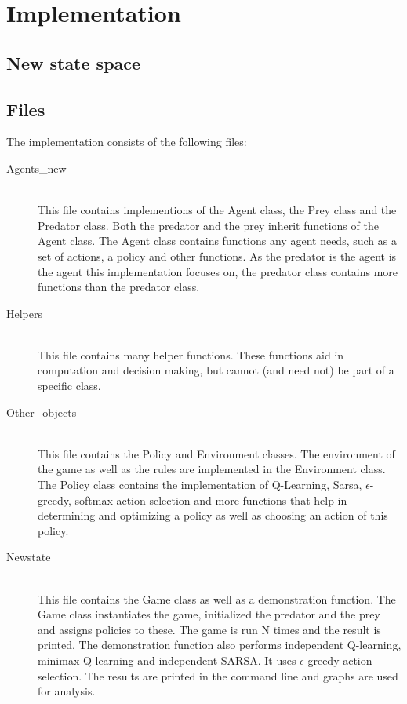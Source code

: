 \documentclass{article}
\begin{document}
\section{Implementation}

\subsection{New state space}


\subsection{Files}

The implementation consists of the following files:
\begin{description}
	\item[Agents\_new] \hfill \\ 
	This file contains implementions of the Agent class, the Prey class and the Predator class. Both the predator and the prey inherit functions of the Agent class. The Agent class contains functions any agent needs, such as a set of actions, a policy and other functions. As the predator is the agent is the agent this implementation focuses on, the predator class contains more functions than the predator class.
	
	\item[Helpers] \hfill \\ 
	This file contains many helper functions. These functions aid in computation and decision making, but cannot (and need not) be part of a specific class.
	
	\item[Other\_objects] \hfill \\ %
	This file contains the Policy and Environment classes. The environment of the game as well as the rules are implemented in the Environment class. The Policy class contains the implementation of Q-Learning, Sarsa, $\epsilon$-greedy, softmax action selection and more functions that help in determining and optimizing a policy as well as choosing an action of this policy.
	\item[Newstate] \hfill \\ 
	This file contains the Game class as well as a demonstration function. The Game class instantiates the game, initialized the predator and the prey and assigns policies to these. The game is run N times and the result is printed. The demonstration function also performs independent Q-learning, minimax Q-learning and independent SARSA. It uses $\epsilon$-greedy action selection. The results are printed in the command line and graphs are used for analysis.
\end{description}
\end{document}
